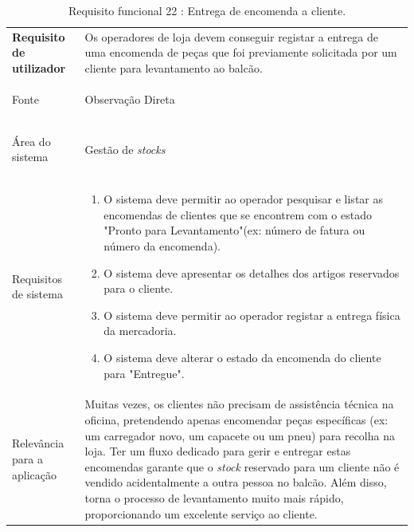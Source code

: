 \documentclass[a4paper,12pt]{scrreprt}
\begin{document}
\begin{table}[H]
    \centering
    \renewcommand{\arraystretch}{1.5} 
    
    \begin{tabular}{|>{\columncolor{gray!15}\bfseries}p{4cm}|p{10.5cm}|}
        \hline
        Requisito de utilizador & Os operadores de loja devem conseguir registar a entrega de uma encomenda de peças que foi previamente solicitada por um cliente para levantamento ao balcão. \\ \hdashline
        
        Fonte & Observação Direta \\ \hdashline
        
        Área do sistema & Gestão de \textit{stocks} \\ \hdashline
        
        Requisitos de sistema & 
        \begin{enumerate}[leftmargin=*, nosep, topsep=2pt, partopsep=0pt]
            \item O sistema deve permitir ao operador pesquisar e listar as encomendas de clientes que se encontrem com o estado "Pronto para Levantamento"\space (ex: número de fatura ou número da encomenda).
            \item O sistema deve apresentar os detalhes dos artigos reservados para o cliente.
            \item O sistema deve permitir ao operador registar a entrega física da mercadoria.
            \item O sistema deve alterar o estado da encomenda do cliente para "Entregue".
        \end{enumerate} \\ \hdashline
        
        Relevância para a aplicação & Muitas vezes, os clientes não precisam de assistência técnica na oficina, pretendendo apenas encomendar peças específicas (ex: um carregador novo, um capacete ou um pneu) para recolha na loja. Ter um fluxo dedicado para gerir e entregar estas encomendas garante que o \textit{stock} reservado para um cliente não é vendido acidentalmente a outra pessoa no balcão. Além disso, torna o processo de levantamento muito mais rápido, proporcionando um excelente serviço ao cliente.\\ \hline
    \end{tabular}
    \caption{Requisito funcional 22 : Entrega de encomenda a cliente.}
    \label{tab:rf_entrega_encomenda_cliente}
\end{table}
\end{document}
